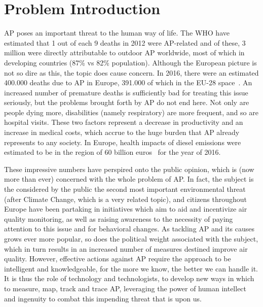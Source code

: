 

\section{Problem Introduction}%
\label{sec:problem_introduction}

\acrlong{AP} poses an important threat to the human way of life. The
\gls{WHO} have estimated that 1 out of each 9 deaths in 2012 were
\gls{AP}-related and of these, 3 million were directly attributable to
outdoor \gls{AP} worldwide, most of which in developing countries (87\%
vs 82\% population). Although the European picture is not so dire as
this, the topic does cause concern. In 2016, there were an estimated
400.000 deaths due to \gls{AP} in Europe, 391.000 of which in the EU-28
space~\cite{Guerreiro2019}. An increased number of premature deaths is
sufficiently bad for treating this issue seriously, but the problems
brought forth by \acrlong{AP} do not end here. Not only are people dying
more, disabilities (namely respiratory) are more frequent, and so are
hospital visits. These two factors represent a decrease in productivity
and an increase in medical costs, which accrue to the huge burden that
\gls{AP} already represents to any society. In Europe, health impacts of
diesel emissions were estimated to be in the region of 60 billion
euros~\cite{CEDelft2018} for the year of 2016.

These impressive numbers have perspired onto the public opinion, which
is (now more than ever) concerned with the whole problem of \gls{AP}. In
fact, the subject is the considered by the public the second most
important environmental threat (after Climate Change, which is a very
related topic), and citizens throughout Europe have been partaking in
initiatives which aim to aid and incentivize air quality monitoring, as
well as raising awareness to the necessity of paying attention to this
issue and for behavioral changes. As tackling \acrlong{AP} and its
causes grows ever more popular, so does the political weight associated
with the subject, which in turn results in an increased number of
measures destined improve air quality. However, effective actions
against \gls{AP} require the approach to be intelligent and
knowledgeable, for the more we know, the better we can handle it. It is
thus the role of technology and technologists, to develop new ways in
which to measure, map, track and trace \gls{AP}, leveraging the power of
human intellect and ingenuity to combat this impending threat that is
upon us.
